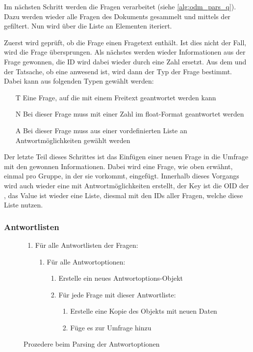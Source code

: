 Im nächsten Schritt werden die Fragen verarbeitet (siehe \cref{alg:odm_pars_q}).
Dazu werden wieder alle Fragen des Dokuments gesammelt und mittels der  gefiltert.
Nun wird über die Liste an Elementen iteriert.

Zuerst wird geprüft, ob die Frage einen Fragetext enthält.
Ist dies nicht der Fall, wird die Frage übersprungen.
Als nächstes werden wieder Informationen aus der Frage gewonnen, die ID wird dabei wieder durch eine Zahl ersetzt.
Aus dem  und der Tatsache, ob eine  anwesend ist, wird dann der Typ der Frage bestimmt.
Dabei kann aus folgenden Typen gewählt werden:

\begin{enumerate}[font=\bfseries, leftmargin=0.5cm]
\item[T] Eine Frage, auf die mit einem Freitext geantwortet werden kann
\item[N] Bei dieser Frage muss mit einer Zahl im float-Format geantwortet werden
\item[A] Bei dieser Frage muss aus einer vordefinierten Liste an Antwortmöglichkeiten gewählt werden
\end{enumerate}

Der letzte Teil dieses Schrittes ist das Einfügen einer neuen Frage in die Umfrage mit den gewonnen Informationen.
Dabei wird eine Frage, wie oben erwähnt, einmal pro Gruppe, in der sie vorkommt, eingefügt.
Innerhalb dieses Vorgangs wird auch wieder eine  mit Antwortmöglichkeiten erstellt, der Key ist die OID der , das Value ist wieder eine Liste, diesmal mit den IDs aller Fragen, welche diese Liste nutzen.

\subsubsection{Antwortlisten}

\begin{figure}[h]
	\begin{enumerate}
		\item Für alle Antwortlisten der Fragen:
			\begin{enumerate}
				\item Für alle Antwortoptionen:
					\begin{enumerate}
						\item Erstelle ein neues Antwortoptions-Objekt
						\item Für jede Frage mit dieser Antwortliste:
							\begin{enumerate}
								\item Erstelle eine Kopie des Objekts mit neuen Daten
								\item Füge es zur Umfrage hinzu
							\end{enumerate}
					\end{enumerate}
			\end{enumerate}
	\end{enumerate}
	\caption{Prozedere beim Parsing der Antwortoptionen}
	\label{alg:odm_pars_ans}
\end{figure}

